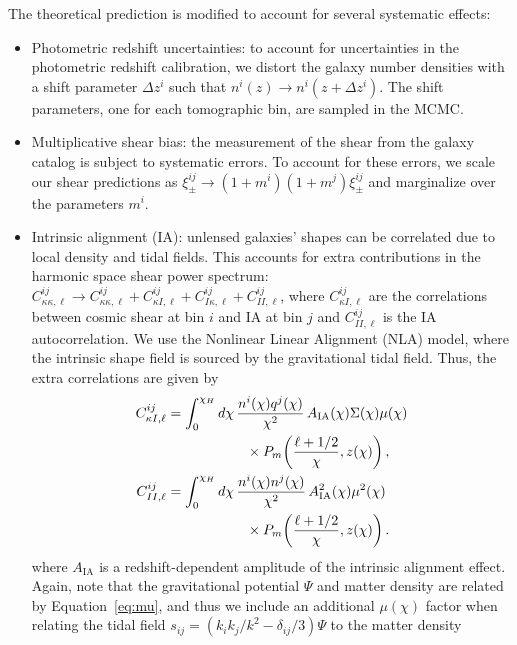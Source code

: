 \documentclass[%
reprint,
superscriptaddress,
preprint numbers,
nofootinbib,
amsmath,amssymb,
aps,
prd
]{revtex4-2}
\begin{document}
The theoretical prediction is modified to account for several systematic effects:
\begin{itemize}
    \item Photometric redshift uncertainties: to account for uncertainties in the photometric redshift calibration, we distort the galaxy number densities with a shift parameter $\Delta z^i$ such that $n^i(z) \rightarrow n^i(z + \Delta z^i)$. The shift parameters, one for each tomographic bin, are sampled in the MCMC.
    \item Multiplicative shear bias: the measurement of the shear from the galaxy catalog is subject to systematic errors. To account for these errors, we scale our shear predictions as $\xi^{ij}_\pm \rightarrow (1 + m^i)(1 + m^j)\xi^{ij}_\pm$ and marginalize over the parameters $m^i$.
    \item Intrinsic alignment (IA): unlensed galaxies' shapes can be correlated due to local density and tidal fields. This accounts for extra contributions in the harmonic space shear power spectrum: $C_{\kappa\kappa, \ell}^{ij} \rightarrow C_{\kappa\kappa, \ell}^{ij} + C_{\kappa I, \ell}^{ij} + C_{I\kappa, \ell}^{ij} + C_{II, \ell}^{ij}$, where $C_{\kappa I, \ell}^{ij}$ are the correlations between cosmic shear at bin $i$ and IA at bin $j$ and $C_{II, \ell}^{ij}$ is the IA autocorrelation. We use the Nonlinear Linear Alignment (NLA) model, where the intrinsic shape field is sourced by the gravitational tidal field. Thus, the extra correlations are given by
    \begin{subequations}
    \begin{align}
    C_{\kappa I,\ell}^{ij}
    &=
    \int_0^{\chi_H} d\chi\,
    \frac{n^i(\chi)q^j(\chi)}{\chi^2}\,
    A_{\rm IA}(\chi)\Sigma(\chi)\mu(\chi)
    \nonumber\\
    &\hspace{2.0cm}\times
    P_m\!\left(
    \frac{\ell+1/2}{\chi},z(\chi)
    \right),
    \\
    C_{II,\ell}^{ij}
    &=
    \int_0^{\chi_H} d\chi\,
    \frac{n^i(\chi)n^j(\chi)}{\chi^2}\,
    A_{\rm IA}^2(\chi)\mu^2(\chi)
    \nonumber\\
    &\hspace{2.0cm}\times
    P_m\!\left(
    \frac{\ell+1/2}{\chi},z(\chi)
    \right).
    \end{align}
    \end{subequations}
    where $A_\mathrm{IA}$ is a redshift-dependent amplitude of the intrinsic alignment effect. Again, note that the gravitational potential $\Psi$ and matter density are related by Equation~\ref{eq:mu}, and thus we include an additional $\mu(\chi)$ factor when relating the tidal field $s_{ij} = (k_ik_j/k^2 - \delta_{ij}/3)\Psi$ to the matter density~\cite{hirata_ia}
    

\end{itemize}
\end{document}
